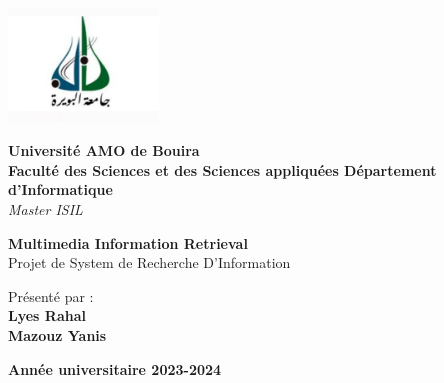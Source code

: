 \documentclass[a4paper,12pt]{report}
\begin{document}
\begin{titlepage}
    \begin{center}
        
          \includegraphics[width=0.3\textwidth]{./logo-unvesite-bouira.png}
        
        {\LARGE \textbf{Université AMO de Bouira }}\\[1.5cm]
        
        {\Large \textbf{Faculté des Sciences et des Sciences appliquées
Département d’Informatique}}\\[0.5cm]
     {\large \textit{Master ISIL}}
        
        \vspace{2cm}
        {\Huge \textbf{Multimedia Information Retrieval}}\\[0.5cm]
        
        {\Large Projet de System de Recherche D'Information}\\[2cm]
        
        \begin{center}
            \Large
            Présenté par : \\
            \textbf{Lyes Rahal}\\
             \textbf{Mazouz Yanis}\\
          
        \end{center}
        
        {\Large \textbf{Année universitaire 2023-2024}}\\[3cm]
        
      
        
    \end{center}
\end{titlepage}
\end{document}
